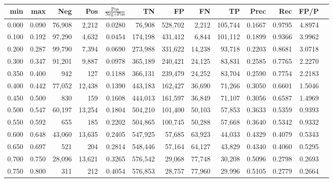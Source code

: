 \begin{tabular}{rrrrrrrrrrrrr}
\toprule
  min &   max &    Neg &    Pos & $\frac{\text{Pos}}{\text{Neg}+\text{Pos}}$ &      TN &      FP &      FN &      TP &   Prec &    Rec &   FP/P \\
\midrule
0.000 & 0.090 & 76,908 &  2,212 &                                     0.0280 &  76,908 & 528,702 &   2,212 & 105,744 & 0.1667 & 0.9795 & 4.8974 \\
0.100 & 0.192 & 97,290 &  4,632 &                                     0.0454 & 174,198 & 431,412 &   6,844 & 101,112 & 0.1899 & 0.9366 & 3.9962 \\
0.200 & 0.287 & 99,790 &  7,394 &                                     0.0690 & 273,988 & 331,622 &  14,238 &  93,718 & 0.2203 & 0.8681 & 3.0718 \\
0.300 & 0.347 & 91,201 &  9,887 &                                     0.0978 & 365,189 & 240,421 &  24,125 &  83,831 & 0.2585 & 0.7765 & 2.2270 \\
0.350 & 0.400 &    942 &    127 &                                     0.1188 & 366,131 & 239,479 &  24,252 &  83,704 & 0.2590 & 0.7754 & 2.2183 \\
0.400 & 0.442 & 77,052 & 12,438 &                                     0.1390 & 443,183 & 162,427 &  36,690 &  71,266 & 0.3050 & 0.6601 & 1.5046 \\
0.450 & 0.500 &    830 &    159 &                                     0.1608 & 444,013 & 161,597 &  36,849 &  71,107 & 0.3056 & 0.6587 & 1.4969 \\
0.500 & 0.547 & 60,197 & 13,254 &                                     0.1804 & 504,210 & 101,400 &  50,103 &  57,853 & 0.3633 & 0.5359 & 0.9393 \\
0.550 & 0.592 &    655 &    185 &                                     0.2202 & 504,865 & 100,745 &  50,288 &  57,668 & 0.3640 & 0.5342 & 0.9332 \\
0.600 & 0.648 & 43,060 & 13,635 &                                     0.2405 & 547,925 &  57,685 &  63,923 &  44,033 & 0.4329 & 0.4079 & 0.5343 \\
0.650 & 0.697 &    521 &    204 &                                     0.2814 & 548,446 &  57,164 &  64,127 &  43,829 & 0.4340 & 0.4060 & 0.5295 \\
0.700 & 0.750 & 28,096 & 13,621 &                                     0.3265 & 576,542 &  29,068 &  77,748 &  30,208 & 0.5096 & 0.2798 & 0.2693 \\
0.750 & 0.800 &    311 &    212 &                                     0.4054 & 576,853 &  28,757 &  77,960 &  29,996 & 0.5105 & 0.2779 & 0.2664 \\

\end{tabular}
